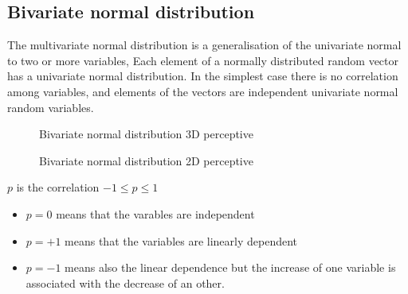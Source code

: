 \subsection{Bivariate normal distribution }
The multivariate normal distribution is a generalisation of the univariate normal to two or more variables, Each element of a normally distributed random vector has a univariate normal distribution. In the simplest case there is no correlation among variables, and elements of the vectors are independent univariate normal random variables. 

\begin{figure}[htbp]
    \def\centerx{2}
    \def\centery{-1}
    
    \centering
    \caption{Bivariate normal distribution 3D perceptive}
    \label{fig:my_label}
\end{figure}
\begin{figure}[htbp]
    \def\centerx{2}
    \def\centery{-1}
    \centering
    \caption{Bivariate normal distribution 2D perceptive}
    \label{fig:my_label}
\end{figure}
$p$ is the correlation $-1 \leq p \leq 1$ 
\begin{itemize}
    \item $p = 0$ means that the varables are independent
    \item $p = +1$ means that the variables are linearly dependent
    \item $p = -1$ means also the linear dependence but the increase of one variable is associated with the decrease of an other.
\end{itemize}
